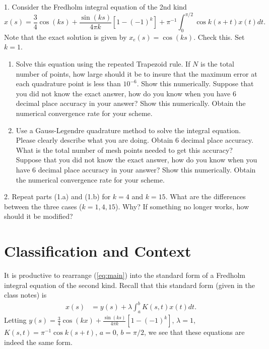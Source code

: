 \documentclass[10pt]{article}
\begin{document}
\begin{description}[wide = 0pt]

\item 1. Consider the Fredholm integral equation of the 2nd kind
\begin{equation}
    x(s) = \frac{3}{4} \cos (ks) + \frac{\sin (ks)}{4\pi k} [1 - (-1)^k] + \pi^{-1} \int_{0}^{\pi/2} \cos k(s + t) x(t) dt\label{eq:main}. 
\end{equation}
Note that the exact solution is given by $x_e(s) = \cos (ks)$. Check this. Set $k = 1$.

\begin{enumerate}[label=(\alph*)]
\item Solve this equation using the repeated Trapezoid rule. If $N$ is the total number of points, how large should it be to insure that the maximum error at each quadrature point is less than $10^{-6}$. Show this numerically. Suppose that you did not know the exact answer, how do you know when you have 6 decimal place accuracy in your answer? Show this numerically. Obtain the numerical convergence rate for your scheme.

\item Use a Gauss-Legendre quadrature method to solve the integral equation. Please clearly describe what you are doing. Obtain 6 decimal place accuracy. What is the total number of mesh points needed to get this accuracy? Suppose that you did not know the exact answer, how do you know when you have 6 decimal place accuracy in your answer? Show this numerically. Obtain the numerical convergence rate for your scheme.

\end{enumerate}


\item 2. Repeat parts (1.a) and (1.b) for $k = 4$ and $k = 15$. What are the differences between the three cases ($k = 1, 4, 15$). Why? If something no longer works, how should it be modified?

\section*{Classification and Context}
It is productive to rearrange (\ref{eq:main}) into the standard form of a Fredholm integral equation of the second kind. Recall that this standard form (given in the class notes) is 
\begin{align}
    x(s) &= y(s) + \lambda \int_a^b K(s, t) x(t) dt. \label{classify}
\end{align}
Letting $y(s) = \frac{3}{4} \cos (kx) + \frac{\sin (ks)}{4\pi k} [1 - (-1)^k]$, $\lambda = 1$, $K(s, t) = \pi^{-1}\cos k (s + t)$, $a = 0$, $b = \pi/2$, we see that these equations are indeed the same form. 


\end{description}
\end{document}
